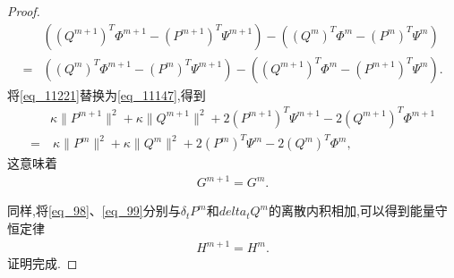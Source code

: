 \begin{proof}
\begin{align}\label{eq_11221}
&((Q^{m+1})^{T}\varPhi^{m+1}-(P^{m+1})^{T}\Psi^{m+1})-((Q^{m})^{T}\varPhi^{m}-(P^{m})^{T}\Psi^{m})\nonumber\\
=&((Q^{m})^{T}\varPhi^{m+1}-(P^{m})^{T}\Psi^{m+1})-((Q^{m+1})^{T}\varPhi^{m}-(P^{m+1})^{T}\Psi^{m}).
\end{align}
将\eqref{eq_11221}替换为\eqref{eq_11147},得到
\begin{align}
&\kappa \|P^{m+1}\|^2+\kappa \|Q^{m+1}\|^2+2(P^{m+1})^{T}\Psi^{m+1}-2(Q^{m+1})^{T}\varPhi^{m+1}\nonumber
\\=&~\kappa \|P^{m}\|^2+\kappa \|Q^{m}\|^2+2(P^{m})^{T}\Psi^{m}-2(Q^{m})^{T}\varPhi^{m},\label{eq_11155}
\end{align}
这意味着
\begin{align}\label{eq_11149}
G^{m+1}=G^{m} .
\end{align}

同样,将\eqref{eq_98}、\eqref{eq_99}分别与$\delta_t P^{m}$和$ delta_t Q^{m}$的离散内积相加,可以得到能量守恒定律
\begin{align}\label{eq_11156}
H^{m+1}=H^{m}.
\end{align}
证明完成.
\end{proof}

